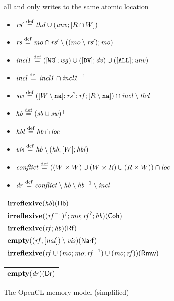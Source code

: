 \documentclass[svgnames,10pt]{sigplanconf}
\theoremstyle{definition}
\newcommand\axiom[1]{\textsf{#1}}
\newcommand\Tag[1]{\mbox{(#1)}}
\newcommand\irreflexive{\mathbf{irreflexive}}
\newcommand\isempty{\mathbf{empty}}
\newcommand\var[1]{\mathit{#1}}
\newcommand\eqdef{\overset{{\tiny\rm def}}{=}}
\newcommand\na{{\tt na}}
\newcommand\swg{{\tt WG}}
\newcommand\sdv{{\tt DV}}
\newcommand\sall{{\tt ALL}}
\newcommand\naL{\var{nal}}
\newcommand\Sb{\var{sb}}
\newcommand\thd{\var{thd}}
\newcommand\unv{\var{unv}}
\newcommand\rf{\var{rf}}
\newcommand\mo{\var{mo}}
\newcommand\hb{\var{hb}}
\newcommand\loc{\var{loc}}
\newcommand\wg{\var{wg}}
\newcommand\dv{\var{dv}}
\begin{document}
\begin{figure}
\begin{shaded}
\begin{itemize}[topsep=0pt, noitemsep]
all and only writes to the same
atomic
location
\end{itemize}
\myskip
{}
\begin{itemize}[topsep=0pt, noitemsep]
\item $\var{rs'} \eqdef \thd \cup (\unv ; [R \cap W])$
\item $\var{rs} \eqdef \mo \cap \var{rs'} \setminus ((mo \setminus \var{rs'}) ; \mo)$
\item $\var{incl1} \eqdef ([\swg] ; \wg) \cup ([\sdv] ; \dv) \cup
([\sall] ; \unv)$
\item $\var{incl} \eqdef \var{incl1} \cap \var{incl1}^{-1}$
\item $\var{sw} \eqdef ([W\setminus\na] ; \var{rs}^? ; \rf ; [R\setminus\na]) \cap \var{incl} \setminus \thd$
\item $\hb \eqdef (\Sb \cup
\var{sw})^+$
\item $\var{hbl} \eqdef \var{hb} \cap \loc$
\item $\var{vis} \eqdef \var{hb} \setminus (\var{hb} ; [W] ; \var{hbl})$
\item $\var{conflict} \eqdef ((W \times W) \cup (W \times R) \cup (R
\times W)) \cap \loc$ 
\item $\var{dr} \eqdef \var{conflict} \setminus \hb \setminus \hb^{-1} \setminus \var{incl}$
\end{itemize}
\myskip
{}
\par\centering
\renewcommand\arraystretch{1.2}
\begin{tabular}{@{}p{82mm}@{}}
$\irreflexive (\hb) \hfill \Tag{\axiom{Hb}}$
\\
$\irreflexive ((\rf^{-1})^? ; \mo ;
\rf^? ; \hb) \hfill
\Tag{\axiom{Coh}}$
\\
$\irreflexive (\rf ; \hb) \hfill
\Tag{\axiom{Rf}}$
\\
$\isempty ((\rf ; [\naL]) \setminus \var{vis}) \hfill \Tag{\axiom{Narf}}$
\\
$\irreflexive (\rf \cup (\mo ; \mo ; \rf^{-1})
\cup (\mo ; \rf)) \hfill \Tag{\axiom{Rmw}}$
\end{tabular}
\par\raggedright
\myskip
{}
\par\centering
\begin{tabular}{@{}p{82mm}@{}}
$\isempty(\var{dr}) \hfill \Tag{\axiom{Dr}}$
\end{tabular}
\end{shaded}
\caption{The OpenCL memory model (simplified)}
\label{fig:openclmm}
\end{figure}
\end{document}
